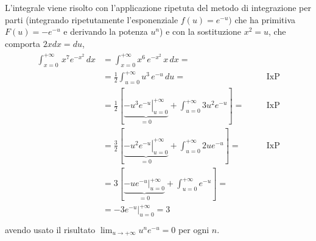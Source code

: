 \documentclass[letterpaper,10pt,italian]{jupyterBook}
\begin{document}
\sphinxAtStartPar
{}
L’integrale viene risolto con l’applicazione ripetuta del metodo di integrazione per parti (integrando ripetutamente l’esponenziale \(f(u) = e^{-u})\) che ha primitiva \(F(u) = -e^{-u}\) e derivando la potenza \(u^n\)) e con la sostituzione \(x^2 = u\), che comporta \(2 x dx = du\),
\begin{equation*}
\begin{split}\begin{aligned}
  \int_{x=0}^{+\infty} \, x^7 e^{-x^2} \, dx 
  & = \int_{x=0}^{+\infty} x^6 \, e^{-x^2} \, x \, dx = \\
  & = \frac{1}{2} \int_{u=0}^{+\infty} u^3 \, e^{-u} \, du = && \quad \text{IxP} \\
  & = \frac{1}{2} \left[ \underbrace{\left. - u^3 e^{-u} \right|_{u=0}^{+\infty}}_{=0} + \int_{u=0}^{+\infty} 3u^2 e^{-u} \right] = && \quad \text{IxP} \\
  & = \frac{3}{2} \left[ \underbrace{\left. - u^2 e^{-u} \right|_{u=0}^{+\infty}}_{=0} + \int_{u=0}^{+\infty} 2u   e^{-u} \right] = && \quad \text{IxP} \\
  & = 3 \left[ \underbrace{\left. - u e^{-u} \right|_{u=0}^{+\infty}}_{=0} + \int_{u=0}^{+\infty}  e^{-u} \right] = &&  \\
  & = - \left.3 e^{-u}\right|_{u=0}^{+\infty} = 3 \\
\end{aligned}\end{split}
\end{equation*}
\sphinxAtStartPar
avendo usato il risultato {\hyperref[\detokenize{ch/infinitesimal_calculus/derivatives:limit:example:lim-xne-x}]{}} \(\lim_{u \rightarrow + \infty} u^n e^{-u} = 0\) per ogni \(n\).
\end{document}
